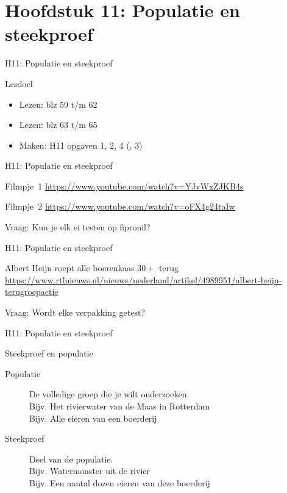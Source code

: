 \section{Hoofdstuk 11: Populatie en steekproef}
\begin{frame}{H11: Populatie en steekproef}
 \begin{block}{Lesdoel}
  \begin{itemize}
   \item Lezen: blz 59 t/m 62
   \item Lezen: blz 63 t/m 65
   \item Maken: H11 opgaven 1, 2, 4 (, 3)
  \end{itemize}
 \end{block}
\end{frame}

\begin{frame}{H11: Populatie en steekproef}

Filmpje~1
\url{https://www.youtube.com/watch?v=YJvWxZJKB4s}

Filmpje~2
\url{https://www.youtube.com/watch?v=oFX4g24taIw}

\bigskip
Vraag: Kun je elk ei testen op fipronil?
\end{frame}

\begin{frame}{H11: Populatie en steekproef}

Albert Heijn roept alle boerenkaas $30+$ terug
\url{https://www.rtlnieuws.nl/nieuws/nederland/artikel/4989951/albert-heijn-terugroepactie}

\bigskip
Vraag: Wordt elke verpakking getest?
\end{frame}

\begin{frame}{H11: Populatie en steekproef}
 \begin{block}{Steekproef en populatie}
  \begin{description}
   \item[Populatie] De volledige groep die je wilt onderzoeken.
   \\ Bijv. Het rivierwater van de Maas in Rotterdam
   \\ Bijv. Alle eieren van een boerderij
   \item[Steekproef] Deel van de populatie.
   \\ Bijv. Watermonster uit de rivier
   \\ Bijv. Een aantal dozen eieren van deze boerderij
  \end{description}
 \end{block}
\end{frame}


